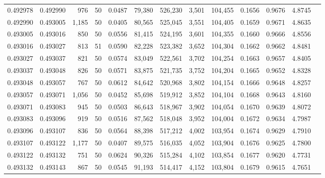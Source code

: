 \begin{tabular}{rrrrrrrrrrrrr}
0.492978 & 0.492990 &   976 &  50 &                                     0.0487 &  79,380 & 526,230 &   3,501 & 104,455 & 0.1656 & 0.9676 & 4.8745 \\
0.492990 & 0.493005 & 1,185 &  50 &                                     0.0405 &  80,565 & 525,045 &   3,551 & 104,405 & 0.1659 & 0.9671 & 4.8635 \\
0.493005 & 0.493016 &   850 &  50 &                                     0.0556 &  81,415 & 524,195 &   3,601 & 104,355 & 0.1660 & 0.9666 & 4.8556 \\
0.493016 & 0.493027 &   813 &  51 &                                     0.0590 &  82,228 & 523,382 &   3,652 & 104,304 & 0.1662 & 0.9662 & 4.8481 \\
0.493027 & 0.493037 &   821 &  50 &                                     0.0574 &  83,049 & 522,561 &   3,702 & 104,254 & 0.1663 & 0.9657 & 4.8405 \\
0.493037 & 0.493048 &   826 &  50 &                                     0.0571 &  83,875 & 521,735 &   3,752 & 104,204 & 0.1665 & 0.9652 & 4.8328 \\
0.493048 & 0.493057 &   767 &  50 &                                     0.0612 &  84,642 & 520,968 &   3,802 & 104,154 & 0.1666 & 0.9648 & 4.8257 \\
0.493057 & 0.493071 & 1,056 &  50 &                                     0.0452 &  85,698 & 519,912 &   3,852 & 104,104 & 0.1668 & 0.9643 & 4.8160 \\
0.493071 & 0.493083 &   945 &  50 &                                     0.0503 &  86,643 & 518,967 &   3,902 & 104,054 & 0.1670 & 0.9639 & 4.8072 \\
0.493083 & 0.493096 &   919 &  50 &                                     0.0516 &  87,562 & 518,048 &   3,952 & 104,004 & 0.1672 & 0.9634 & 4.7987 \\
0.493096 & 0.493107 &   836 &  50 &                                     0.0564 &  88,398 & 517,212 &   4,002 & 103,954 & 0.1674 & 0.9629 & 4.7910 \\
0.493107 & 0.493122 & 1,177 &  50 &                                     0.0407 &  89,575 & 516,035 &   4,052 & 103,904 & 0.1676 & 0.9625 & 4.7800 \\
0.493122 & 0.493132 &   751 &  50 &                                     0.0624 &  90,326 & 515,284 &   4,102 & 103,854 & 0.1677 & 0.9620 & 4.7731 \\
0.493132 & 0.493143 &   867 &  50 &                                     0.0545 &  91,193 & 514,417 &   4,152 & 103,804 & 0.1679 & 0.9615 & 4.7651 \\

\end{tabular}
